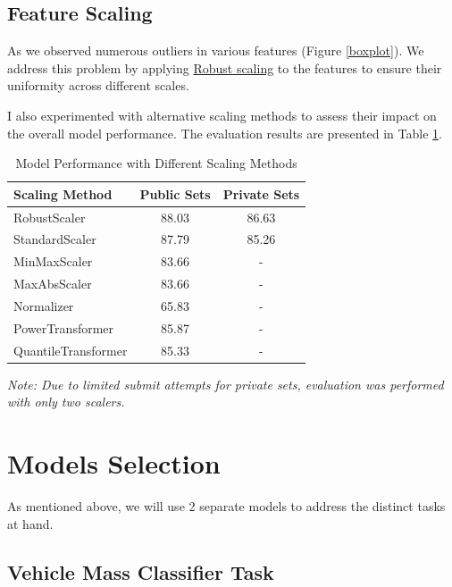\documentclass[conference]{IEEEtran}
\begin{document}
\subsection{Feature Scaling}
As we observed numerous outliers in various features (Figure \ref{boxplot}). We address this problem by applying \href{https://scikit-learn.org/stable/modules/generated/sklearn.preprocessing.RobustScaler.html}{Robust scaling} to the features to ensure their uniformity across different scales. 

I also experimented with alternative scaling methods to assess their impact on the overall model performance. The evaluation results are presented in Table \ref{tab:model_performance}.

\begin{table}[h]
    \centering
    \caption{Model Performance with Different Scaling Methods}
    \begin{tabular}{lcc}
    \toprule
    \textbf{Scaling Method} & \textbf{Public Sets} & \textbf{Private Sets} \\
    \midrule
    RobustScaler & 88.03 & 86.63 \\
    StandardScaler & 87.79 & 85.26 \\
    MinMaxScaler & 83.66 & - \\
    MaxAbsScaler & 83.66 & - \\
    Normalizer & 65.83 & - \\
    PowerTransformer & 85.87 & - \\
    QuantileTransformer & 85.33 & - \\
    \bottomrule
    \end{tabular}
    \begin{flushleft}
        \small\textit{Note: Due to limited submit attempts for private sets, evaluation was performed with only two scalers.}
        \end{flushleft}
    \label{tab:model_performance}
    \end{table}
    
\section{Models Selection}
As mentioned above, we will use 2 separate models to address the distinct tasks at hand.
\subsection{Vehicle Mass Classifier Task}\label{task:classifier}
\end{document}
